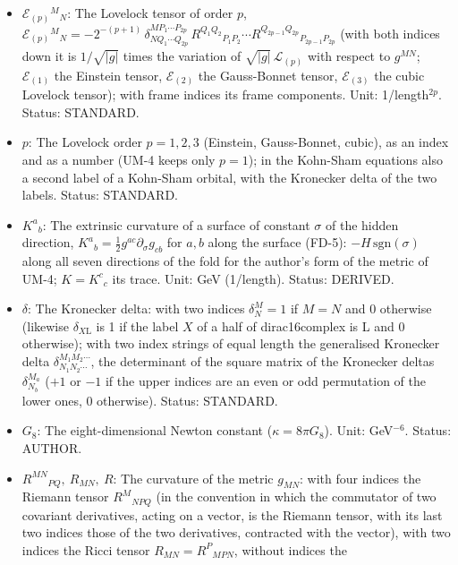 \documentclass[
  10pt,
]{article}
\begin{document}
\begin{itemize}
  Status: DERIVED.
\item
  \(\mathcal{E}_{(p)}{}^M{}_N\): The Lovelock tensor of order \(p\),
  \(\mathcal{E}_{(p)}{}^M{}_N = -2^{-(p+1)}\,\delta^{MP_1\cdots P_{2p}}_{NQ_1\cdots Q_{2p}}\,R^{Q_1Q_2}{}_{P_1P_2}\cdots R^{Q_{2p-1}Q_{2p}}{}_{P_{2p-1}P_{2p}}\)
  (with both indices down it is \(1/\sqrt{\lvert g\rvert}\) times the
  variation of \(\sqrt{\lvert g\rvert}\,\mathcal{L}_{(p)}\) with respect
  to \(g^{MN}\); \(\mathcal{E}_{(1)}\) the Einstein tensor,
  \(\mathcal{E}_{(2)}\) the Gauss-Bonnet tensor, \(\mathcal{E}_{(3)}\)
  the cubic Lovelock tensor); with frame indices its frame components.
  Unit: 1/length\(^{2p}\). Status: STANDARD.
\item
  \(p\): The Lovelock order \(p = 1, 2, 3\) (Einstein, Gauss-Bonnet,
  cubic), as an index and as a number (UM-4 keeps only \(p = 1\)); in
  the Kohn-Sham equations also a second label of a Kohn-Sham orbital,
  with the Kronecker delta of the two labels. Status: STANDARD.
\item
  \(K^a{}_b\): The extrinsic curvature of a surface of constant
  \(\sigma\) of the hidden direction,
  \(K^a{}_b = \frac12 g^{ac}\partial_\sigma g_{cb}\) for \(a, b\) along
  the surface (FD-5): \(-H\,\mathrm{sgn}(\sigma)\) along all seven
  directions of the fold for the author's form of the metric of UM-4;
  \(K = K^c{}_c\) its trace. Unit: GeV (1/length). Status: DERIVED.
\item
  \(\delta\): The Kronecker delta: with two indices \(\delta^M_N = 1\)
  if \(M = N\) and 0 otherwise (likewise \(\delta_{X\mathrm{L}}\) is 1
  if the label \(X\) of a half of dirac16complex is L and 0 otherwise);
  with two index strings of equal length the generalised Kronecker delta
  \(\delta^{M_1M_2\cdots}_{N_1N_2\cdots}\), the determinant of the
  square matrix of the Kronecker deltas \(\delta^{M_a}_{N_b}\) (\(+1\)
  or \(-1\) if the upper indices are an even or odd permutation of the
  lower ones, 0 otherwise). Status: STANDARD.
\item
  \(G_8\): The eight-dimensional Newton constant
  (\(\kappa = 8\pi G_8\)). Unit: GeV\(^{-6}\). Status: AUTHOR.
\item
  \(R^{MN}{}_{PQ},\ R_{MN},\ R\): The curvature of the metric
  \(g_{MN}\): with four indices the Riemann tensor \(R^M{}_{NPQ}\) (in
  the convention in which the commutator of two covariant derivatives,
  acting on a vector, is the Riemann tensor, with its last two indices
  those of the two derivatives, contracted with the vector), with two
  indices the Ricci tensor \(R_{MN} = R^P{}_{MPN}\), without indices the

\end{itemize}
\end{document}
